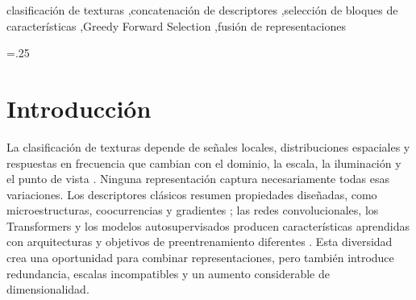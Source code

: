 \documentclass[a4paper,fleqn]{cas-sc}
\begin{document}
\begin{abstract}
Este trabajo evalúa la concatenación de descriptores heterogéneos para clasificar texturas. Se comparan cinco estrategias: Individual, Completa, Top-$k$, Greedy Forward Selection (GFS) y Homogénea. La biblioteca común reúne 22 descriptores, incluidos RGB N-gramas + SVD y BEiTv2-B, sobre DTD, FMD, CUReT, Outex, Soil y KTH-TIPS2-b con SVM lineal y ResMLP. La selección se realiza dentro del entrenamiento y el desempeño se mide mediante macro-F1 y exactitud en 94 condiciones externas. Friedman, Iman--Davenport y Quade detectan diferencias globales para ambos clasificadores, mientras Friedman alineado no rechaza. Tras ajustar con Holm los diez pares basados en Friedman dentro de cada clasificador, GFS supera a Individual con ResMLP; ningún par resulta significativo con SVM. La adición de BEiTv2 a la concatenación completa produce cambios pequeños y dependientes del dominio, sin diferencia global significativa frente a la biblioteca de 21 bloques. Los resultados respaldan elegir la composición y el costo dimensional según el dominio, sin afirmar superioridad universal de una estrategia.
\end{abstract}

\begin{keywords}
clasificación de texturas \sep concatenación de descriptores \sep selección de bloques de características \sep Greedy Forward Selection \sep fusión de representaciones
\end{keywords}

\hfuzz=.25\textwidth
\maketitle
\hfuzz=0.1pt

\section{Introducción}\label{sec:introduccion}

La clasificación de texturas depende de señales locales, distribuciones espaciales y respuestas en frecuencia que cambian con el dominio, la escala, la iluminación y el punto de vista \citep{cimpoi2014dtd,cimpoi2016fisher,liu2019survey}. Ninguna representación captura necesariamente todas esas variaciones. Los descriptores clásicos resumen propiedades diseñadas, como microestructuras, coocurrencias y gradientes \citep{ojala2002lbp,haralick1979glcm,dalal2005hog}; las redes convolucionales, los Transformers y los modelos autosupervisados producen características aprendidas con arquitecturas y objetivos de preentrenamiento diferentes \citep{he2016resnet,tan2019efficientnet,dosovitskiy2021vit,liu2021swin,oquab2024dinov2}. Esta diversidad crea una oportunidad para combinar representaciones, pero también introduce redundancia, escalas incompatibles y un aumento considerable de dimensionalidad.
\end{document}
